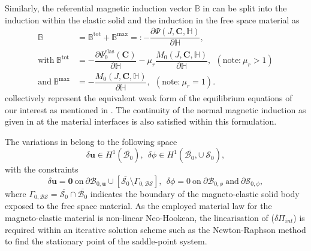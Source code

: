 Similarly, the referential magnetic induction vector $\mathbb{B}$ in  can be split into the induction within the elastic solid and the induction in the free space material as
\begin{align}
\mathbb{B} &= \mathbb{B}^{\text{tot}} + \mathbb{B}^{\text{max}} =: -\dfrac{\partial \Psi (J, \mathbf{C}, \mathbb{H})}{\partial \mathbb{H}}, \\
\text{with} \ \mathbb{B}^{\text{tot}} &= -\dfrac{\partial \Psi_0^{\text{elas}} (\mathbf{C})}{\partial \mathbb{H}} - \mu_r \dfrac{M_0 (J, \mathbf{C}, \mathbb{H})}{\partial \mathbb{H}}, \ \ (\text{note:} \ \mu_r > 1)\\
\text{and} \ \mathbb{B}^{\text{max}} &= -\dfrac{M_0 (J, \mathbf{C}, \mathbb{H})}{\partial \mathbb{H}}, \ \ (\text{note:} \ \mu_r = 1).
\end{align}
 collectively represent the equivalent weak form of the equilibrium equations of our interest as mentioned in . The continuity of the normal magnetic induction as given in  at the material interfaces is also satisfied within this formulation. \par 

\noindent The variations in  belong to the following space
\begin{equation}
\delta \mathbf{u} \in H^1 (\overline{\mathcal{B}_0}), \ \ \delta \phi \in H^1 (\overline{\mathcal{B}_0}, \cup \ \mathcal{S}_0),
\end{equation}
with the constraints 
\begin{equation}
\delta \mathbf{u} = \mathbf{0} \ \text{on} \ \partial \mathcal{B}_{0,\mathbf{u}} \cup \left[ \overline{\mathcal{S}_0} \setminus \Gamma_{0, \mathcal{BS}} \right], \ \ \delta \phi = 0 \ \text{on} \ \partial \mathcal{B}_{0,\phi} \ \text{and} \ \partial \mathcal{S}_{0,\phi},
\end{equation}
where $\Gamma_{0, \mathcal{BS}} = \overline{\mathcal{S}_0} \cap \overline{\mathcal{B}_0}$ indicates the boundary of the magneto-elastic solid body exposed to the free space material. As the employed material law for the magneto-elastic material is non-linear Neo-Hookean, the linearisation of  ($\delta \Pi_{int}$) is required within an iterative solution scheme such as the Newton-Raphson method to find the stationary point of the saddle-point system. 


